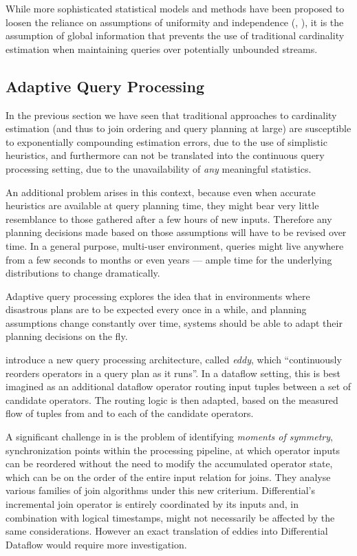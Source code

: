 \documentclass[../index.tex]{subfiles}
\begin{document}
While more sophisticated statistical models and methods have been
proposed to loosen the reliance on assumptions of uniformity and
independence (\cite{markl2007consistent}, \cite{ilyas2004cords}), it
is the assumption of global information that prevents the use of
traditional cardinality estimation when maintaining queries over
potentially unbounded streams.

\subsection{Adaptive Query Processing} \label{technique-adaptive}

In the previous section we have seen that traditional approaches to
cardinality estimation (and thus to join ordering and query planning
at large) are susceptible to exponentially compounding estimation
errors, due to the use of simplistic heuristics, and furthermore can
not be translated into the continuous query processing setting, due to
the unavailability of \emph{any} meaningful statistics.

An additional problem arises in this context, because even when
accurate heuristics are available at query planning time, they might
bear very little resemblance to those gathered after a few hours of
new inputs. Therefore any planning decisions made based on those
assumptions will have to be revised over time. In a general purpose,
multi-user environment, queries might live anywhere from a few seconds
to months or even years — ample time for the underlying distributions
to change dramatically.

Adaptive query processing explores the idea that in environments where
disastrous plans are to be expected every once in a while, and
planning assumptions change constantly over time, systems should be
able to adapt their planning decisions on the fly.

\cite{avnur2000eddies} introduce a new query processing architecture,
called \emph{eddy}, which ``continuously reorders operators in a query
plan as it runs''. In a dataflow setting, this is best imagined as an
additional dataflow operator routing input tuples between a set of
candidate operators. The routing logic is then adapted, based on the
measured flow of tuples from and to each of the candidate operators.

A significant challenge in \cite{avnur2000eddies} is the problem of
identifying \emph{moments of symmetry}, synchronization points within
the processing pipeline, at which operator inputs can be reordered
without the need to modify the accumulated operator state, which can
be on the order of the entire input relation for joins. They analyse
various families of join algorithms under this new
criterium. Differential's incremental join operator is entirely
coordinated by its inputs and, in combination with logical timestamps,
might not necessarily be affected by the same considerations. However
an exact translation of eddies into Differential Dataflow would
require more investigation.
\end{document}
